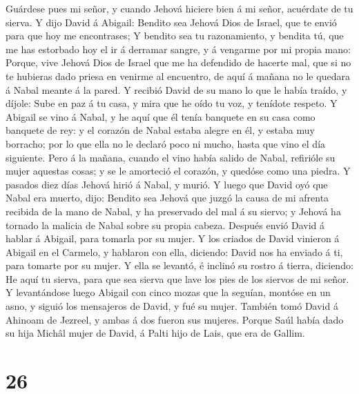 Guárdese pues mi señor, y cuando Jehová hiciere bien á mi señor,
acuérdate de tu sierva.  Y dijo David á Abigail: Bendito
sea Jehová Dios de Israel, que te envió para que hoy me encontrases;
 Y bendito sea tu razonamiento, y bendita tú, que me has
estorbado hoy el ir á derramar sangre, y á vengarme por mi propia mano:
 Porque, vive Jehová Dios de Israel que me ha defendido
de hacerte mal, que si no te hubieras dado priesa en venirme al
encuentro, de aquí á mañana no le quedara á Nabal meante á la pared.
 Y recibió David de su mano lo que le había traído, y
díjole: Sube en paz á tu casa, y mira que he oído tu voz, y tenídote
respeto.  Y Abigail se vino á Nabal, y he aquí que él
tenía banquete en su casa como banquete de rey: y el corazón de Nabal
estaba alegre en él, y estaba muy borracho; por lo que ella no le
declaró poco ni mucho, hasta que vino el día siguiente. 
Pero á la mañana, cuando el vino había salido de Nabal, refirióle su
mujer aquestas cosas; y se le amorteció el corazón, y quedóse como una
piedra.  Y pasados diez días Jehová hirió á Nabal, y
murió.  Y luego que David oyó que Nabal era muerto, dijo:
Bendito sea Jehová que juzgó la causa de mi afrenta recibida de la mano
de Nabal, y ha preservado del mal á su siervo; y Jehová ha tornado la
malicia de Nabal sobre su propia cabeza. Después envió David á hablar á
Abigail, para tomarla por su mujer.  Y los criados de
David vinieron á Abigail en el Carmelo, y hablaron con ella, diciendo:
David nos ha enviado á ti, para tomarte por su mujer.  Y
ella se levantó, é inclinó su rostro á tierra, diciendo: He aquí tu
sierva, para que sea sierva que lave los pies de los siervos de mi
señor.  Y levantándose luego Abigail con cinco mozas que
la seguían, montóse en un asno, y siguió los mensajeros de David, y fué
su mujer.  También tomó David á Ahinoam de Jezreel, y
ambas á dos fueron sus mujeres.  Porque Saúl había dado
su hija Michâl mujer de David, á Palti hijo de Lais, que era de Gallim.

\hypertarget{section-25}{%
\section{26}\label{section-25}}

